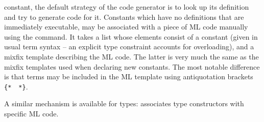 \begin{isabellebody}
\begin{isamarkuptext}
  constant, the default strategy of the code generator is to look up
  its definition and try to generate code for it.  Constants which
  have no definitions that are immediately executable, may be
  associated with a piece of ML code manually using the \hyperlink{command.consts-code}{\mbox{}} command.  It takes a list whose elements consist of a
  constant (given in usual term syntax -- an explicit type constraint
  accounts for overloading), and a mixfix template describing the ML
  code. The latter is very much the same as the mixfix templates used
  when declaring new constants.  The most notable difference is that
  terms may be included in the ML template using antiquotation
  brackets \verb|{|\verb|*|~~\verb|*|\verb|}|.

  A similar mechanism is available for types: \hyperlink{command.types-code}{\mbox{}} associates type constructors with specific ML code.


\end{isamarkuptext}
\end{isabellebody}
